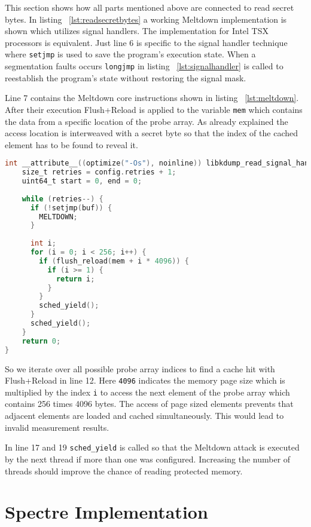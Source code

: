 \documentclass[a4paper,oneside,openright] {scrreprt}
\begin{document}
This section shows how all parts mentioned above are connected to read secret bytes.
In listing ~\ref{lst:readsecretbytes} a working Meltdown implementation is shown which utilizes
signal handlers. The implementation for Intel TSX processors is equivalent.
Just line 6 is specific to the signal handler technique where \texttt{setjmp} is used to save the program's execution state.
When a segmentation faults occurs \texttt{longjmp} in listing ~\ref{lst:signalhandler} is called to reestablish the program's state
without restoring the signal mask.

Line 7 contains the Meltdown core instructions shown in listing ~\ref{lst:meltdown}.
After their execution Flush+Reload is applied to the variable \texttt{mem} which contains the data
from a specific location of the probe array. As already explained the access location is interweaved with a
secret byte so that the index of the cached element has to be found to reveal it.


\begin{lstlisting}[language=C, caption=Meltdown: Reading Secret Bytes, label={lst:readsecretbytes}]
int __attribute__((optimize("-Os"), noinline)) libkdump_read_signal_handler() {
    size_t retries = config.retries + 1;
    uint64_t start = 0, end = 0;
  
    while (retries--) {
      if (!setjmp(buf)) {
        MELTDOWN;
      }
  
      int i;
      for (i = 0; i < 256; i++) {
        if (flush_reload(mem + i * 4096)) {
          if (i >= 1) {
            return i;
          }
        }
        sched_yield();
      }
      sched_yield();
    }
    return 0;
}
\end{lstlisting}

So we iterate over all possible probe array indices to find a cache hit with Flush+Reload in line 12.
Here \texttt{4096} indicates the memory page size which is multiplied by the index \texttt{i} to access the next element
of the probe array which contains 256 times 4096 bytes. The access of page sized elements prevents that adjacent elements are loaded
and cached simultaneously. This would lead to invalid measurement results.

In line 17 and 19 \texttt{sched\_yield} is called so that the Meltdown attack is executed by the next thread if more
than one was configured. Increasing the number of threads should improve the chance of reading protected memory.


\section{Spectre Implementation}
\label{ch:intro:motivation}
\end{document}
